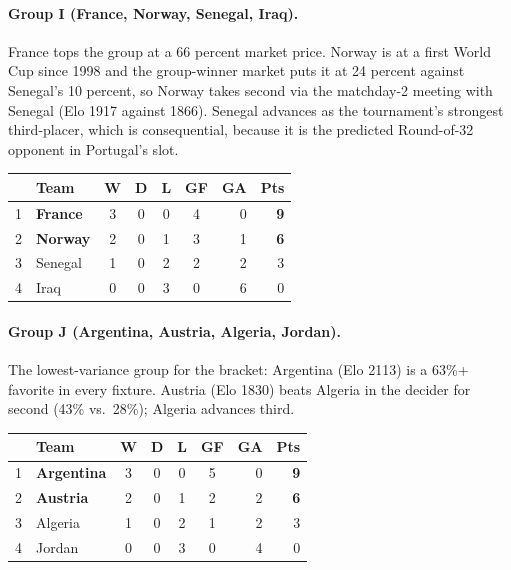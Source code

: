 \documentclass[11pt,letterpaper]{article}
\begin{document}
\paragraph{Group I (France, Norway, Senegal, Iraq).} France tops the group at a 66 percent market price. Norway is at a first World Cup since 1998 and the group-winner market puts it at 24 percent against Senegal's 10 percent, so Norway takes second via the matchday-2 meeting with Senegal (Elo 1917 against 1866). Senegal advances as the tournament's strongest third-placer, which is consequential, because it is the predicted Round-of-32 opponent in Portugal's slot.
\smallskip{}\\[1pt]
{\footnotesize
\begin{tabular}{@{}clccccrr@{}}
\toprule
 & Team & W & D & L & GF & GA & Pts \\
\midrule
1 & \textbf{France} & 3 & 0 & 0 & 4 & 0 & \textbf{9} \\
2 & \textbf{Norway} & 2 & 0 & 1 & 3 & 1 & \textbf{6} \\
3 & Senegal & 1 & 0 & 2 & 2 & 2 & 3 \\
4 & Iraq & 0 & 0 & 3 & 0 & 6 & 0 \\
\bottomrule
\end{tabular}}\smallskip

\paragraph{Group J (Argentina, Austria, Algeria, Jordan).} The lowest-variance group for the bracket: Argentina (Elo 2113) is a 63\%+ favorite in every fixture. Austria (Elo 1830) beats Algeria in the decider for second (43\% vs.\ 28\%); Algeria advances third.
\smallskip{}\\[1pt]
{\footnotesize
\begin{tabular}{@{}clccccrr@{}}
\toprule
 & Team & W & D & L & GF & GA & Pts \\
\midrule
1 & \textbf{Argentina} & 3 & 0 & 0 & 5 & 0 & \textbf{9} \\
2 & \textbf{Austria} & 2 & 0 & 1 & 2 & 2 & \textbf{6} \\
3 & Algeria & 1 & 0 & 2 & 1 & 2 & 3 \\
4 & Jordan & 0 & 0 & 3 & 0 & 4 & 0 \\
\bottomrule
\end{tabular}}\smallskip
\end{document}
